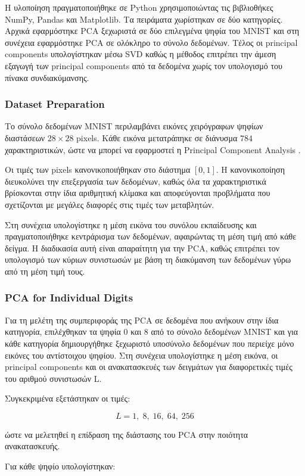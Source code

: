 \documentclass[12pt]{article}
\begin{document}
Η υλοποίηση πραγματοποιήθηκε σε Python χρησιμοποιώντας τις βιβλιοθήκες NumPy, Pandas και Matplotlib. Τα πειράματα χωρίστηκαν σε δύο κατηγορίες. Αρχικά 
εφαρμόστηκε PCA ξεχωριστά σε δύο επιλεγμένα ψηφία του MNIST και στη συνέχεια εφαρμόστηκε PCA σε ολόκληρο το σύνολο δεδομένων. Τέλος οι principal components 
υπολογίστηκαν μέσω SVD καθώς η μέθοδος επιτρέπει την άμεση εξαγωγή των principal components από τα δεδομένα χωρίς τον υπολογισμό του πίνακα συνδιακύμανσης.

\subsubsection{Dataset Preparation}
Το σύνολο δεδομένων MNIST περιλαμβάνει εικόνες χειρόγραφων ψηφίων διαστάσεων $28 \times 28$ pixels. Κάθε εικόνα μετατράπηκε σε διάνυσμα $784$ 
χαρακτηριστικών, ώστε να μπορεί να εφαρμοστεί η Principal Component Analysis .

Οι τιμές των pixels κανονικοποιήθηκαν στο διάστημα $[0,1]$. Η κανονικοποίηση διευκολύνει την επεξεργασία των δεδομένων, καθώς όλα τα χαρακτηριστικά 
βρίσκονται στην ίδια αριθμητική κλίμακα και αποφεύγονται προβλήματα που σχετίζονται με μεγάλες διαφορές στις τιμές των μεταβλητών.

Στη συνέχεια υπολογίστηκε η μέση εικόνα του συνόλου εκπαίδευσης και πραγματοποιήθηκε κεντράρισμα των δεδομένων, αφαιρώντας τη μέση τιμή από κάθε δείγμα. 
Η διαδικασία αυτή είναι απαραίτητη για την PCA, καθώς επιτρέπει τον υπολογισμό των κύριων συνιστωσών με βάση τη διακύμανση των δεδομένων γύρω από τη μέση 
τιμή τους.

\subsubsection{PCA for Individual Digits}
Για τη μελέτη της συμπεριφοράς της PCA σε δεδομένα που ανήκουν στην ίδια κατηγορία, επιλέχθηκαν τα ψηφία 0 και 8 από το σύνολο δεδομένων MNIST και
για κάθε κατηγορία δημιουργήθηκε ξεχωριστό υποσύνολο δεδομένων που περιείχε μόνο εικόνες του αντίστοιχου ψηφίου. Στη συνέχεια υπολογίστηκε η μέση εικόνα,
οι principal components και οι ανακατασκευές των δειγμάτων για διαφορετικές τιμές του αριθμού συνιστωσών L.

Συγκεκριμένα εξετάστηκαν οι τιμές:

\[
L=1,\;8,\;16,\;64,\;256
\]

ώστε να μελετηθεί η επίδραση της διάστασης του PCA στην ποιότητα ανακατασκευής.

Για κάθε ψηφίο υπολογίστηκαν:
\end{document}
